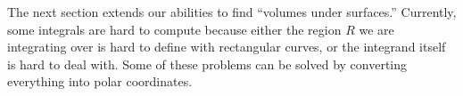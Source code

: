 The next section extends our abilities to find ``volumes under surfaces.'' Currently, some integrals are hard to compute because either the region $R$ we are integrating over is hard to define with rectangular curves, or the integrand itself is hard to deal with. Some of these problems can be solved by converting everything into polar coordinates.

